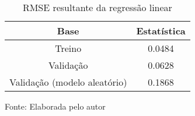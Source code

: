 
\begin{table}[h]
\centering
\caption{RMSE resultante da regressão linear}
\label{tab:cap3_rmse_reg_lin}
\begin{tabular}{cc}
Base & Estatística \\
\hline
Treino & 0.0484 \\
Validação & 0.0628 \\
Validação (modelo aleatório) & 0.1868 \\
\hline
\end{tabular}

Fonte: Elaborada pelo autor
\end{table}
